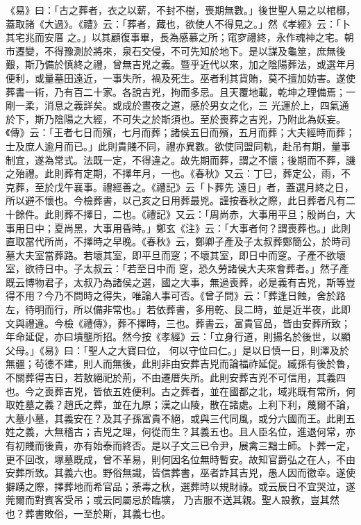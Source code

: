 \begin{pinyinscope}
 《易》曰：「古之葬者，衣之以薪，不封不樹，喪期無數。」後世聖人易之以棺槨，蓋取諸《大過》。《禮》云：「葬者，藏也，欲使人不得見之。」然《孝經》云：「卜其宅兆而安厝
 之。」以其顧復事畢，長為感慕之所；窀穸禮終，永作魂神之宅。朝市遷變，不得豫測於將來，泉石交侵，不可先知於地下。是以謀及龜筮，庶無後艱，斯乃備於慎終之禮，曾無吉兇之義。暨乎近代以來，加之陰陽葬法，或選年月便利，或量墓田遠近，一事失所，禍及死生。巫者利其貨賄，莫不擅加妨害。遂使葬書一術，乃有百二十家。各說吉兇，拘而多忌。且天覆地載，乾坤之理備焉；一剛一柔，消息之義詳矣。或成於晝夜之道，感於男女之化，三
 光運於上，四氣通於下，斯乃陰陽之大經，不可失之於斯須也。至於喪葬之吉兇，乃附此為妖妄。《傳》云：「王者七日而殯，七月而葬；諸侯五日而殯，五月而葬；大夫經時而葬；士及庶人逾月而已。」此則貴賤不同，禮亦異數。欲使同盟同軌，赴吊有期，量事制宜，遂為常式。法既一定，不得違之。故先期而葬，謂之不懷；後期而不葬，譏之殆禮。此則葬有定期，不擇年月，一也。《春秋》又云：丁巳，葬定公，雨，不克葬，至於戊午襄事。禮經善之。《禮記》云「卜葬先
 遠日」者，蓋選月終之日，所以避不懷也。今檢葬書，以己亥之日用葬最兇。謹按春秋之際，此日葬者凡有二十餘件。此則葬不擇日，二也。《禮記》又云：「周尚赤，大事用平旦；殷尚白，大事用日中；夏尚黑，大事用昏時。」鄭玄《注》云：「大事者何？謂喪葬也。」此則直取當代所尚，不擇時之早晚。《春秋》云，鄭卿子產及子太叔葬鄭簡公，於時司墓大夫室當葬路。若壞其室，即平旦而窆；不壞其室，即日中而窆。子產不欲壞室，欲待日中。子太叔云：「若至日中而
 窆，恐久勞諸侯大夫來會葬者。」然子產既云博物君子，太叔乃為諸侯之選，國之大事，無過喪葬，必是義有吉兇，斯等豈得不用？今乃不問時之得失，唯論人事可否。《曾子問》云：「葬逢日蝕，舍於路左，待明而行，所以備非常也。」若依葬書，多用乾、艮二時，並是近半夜，此即文與禮違。今檢《禮傳》，葬不擇時，三也。葬書云，富貴官品，皆由安葬所致；年命延促，亦曰墳壟所招。然今按《孝經》云：「立身行道，則揚名於後世，以顯父母。」《易》曰：「聖人之大寶曰位，
 何以守位曰仁。」是以日慎一日，則澤及於無疆；茍德不建，則人而無後，此則非由安葬吉兇而論福祚延促。臧孫有後於魯，不關葬得吉日，若敖絕祀於荊，不由遷厝失所。此則安葬吉兇不可信用，其義四也。今之喪葬吉兇，皆依五姓便利。古之葬者，並在國都之北，域兆既有常所，何取姓墓之義？趙氏之葬，並在九原；漢之山陵，散在諸處。上利下利，蔑爾不論，大墓小墓，其義安在？及其子孫富貴不絕，或與三代同風，或分六國而王。此則五
 姓之義，大無稽古；吉兇之理，何從而生？其義五也。且人臣名位，進退何常，亦有初賤而後貴，亦有始泰而終否。是以子文三已令尹，展禽三黜士師。卜葬一定，更不回改，塚墓既成，曾不革易，則何因名位無時暫安。故知官爵弘之在人，不由安葬所致。其義六也。野俗無識，皆信葬書，巫者詐其吉兇，愚人因而徼幸。遂使擗踴之際，擇葬地而希官品；荼毒之秋，選葬時以規財祿。或云辰日不宜哭泣，遂莞爾而對賓客受吊；或云同屬忌於臨壙，
 乃吉服不送其親。聖人設教，豈其然也？葬書敗俗，一至於斯，其義七也。




\end{pinyinscope}

